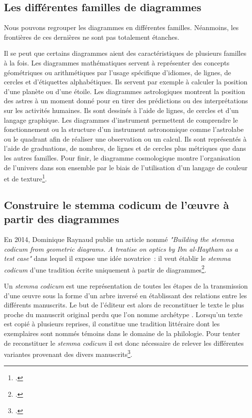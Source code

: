 \subsection{Les différentes familles de diagrammes}
Nous pouvons regrouper les diagrammes en différentes familles.
Néanmoins, les frontières de ces dernières ne sont pas totalement étanches.

Il se peut que certains diagrammes aient des caractéristiques de plusieurs familles à la fois.
Les diagrammes mathématiques servent à représenter des concepts géométriques ou arithmétiques par l'usage spécifique d'idiomes, de lignes, de cercles et d'étiquettes alphabétiques.
Ils servent par exemple à calculer la position d'une planète ou d'une étoile.
Les diagrammes astrologiques montrent la position des astres à un moment donné pour en tirer des prédictions ou des interprétations sur les activités humaines.
Ils sont dessinés à l'aide de lignes, de cercles et d'un langage graphique.
Les diagrammes d'instrument permettent de comprendre le fonctionnement ou la structure d'un instrument astronomique comme l'astrolabe ou le quadrant afin de réaliser une observation ou un calcul.
Ils sont représentés à l'aide de graduations, de nombres, de lignes et de cercles plus métriques que dans les autres familles.
Pour finir, le diagramme cosmologique montre l'organisation de l'univers dans son ensemble par le biais de l'utilisation d'un langage de couleur et de texture\footcite{Conference2025Long2025}.

\subsection{Construire le stemma codicum de l'œuvre à partir des diagrammes}

En 2014, Dominique Raynaud publie un article nommé \textit{"Building the stemma codicum from geometric diagrams.
A treatise on optics by Ibn al-Haytham as a test case"} dans lequel il expose une idée novatrice~: il veut établir le \textit{stemma codicum} d'une tradition écrite uniquement à partir de diagrammes\footcite{raynaudBuildingStemmaCodicum2014}.

Un \textit{stemma codicum} est une représentation de toutes les étapes de la transmission d'une œuvre sous la forme d'un arbre inversé en établissant des relations entre les différents manuscrits.
Le but de l'éditeur est alors de reconstituer le texte le plus proche du manuscrit original perdu que l'on nomme \og archétype \fg.
Lorsqu'un texte est copié à plusieurs reprises, il constitue une \og tradition littéraire \fg dont les exemplaires sont nommés \og témoins \fg dans le domaine de la philologie.
Pour tenter de reconstituer le \textit{stemma codicum} il est donc nécessaire de relever les différentes variantes provenant des divers manuscrits\footcite{pouliquenUsingLatticesReconstructing}.

